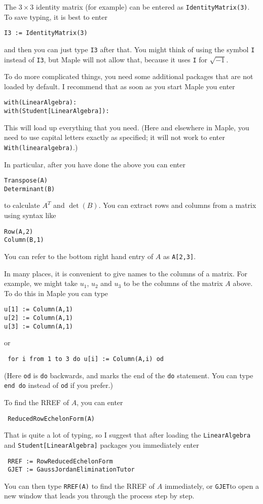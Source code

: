 \documentclass{amsart}
\begin{document}
The $3\times 3$ identity matrix (for example) can be entered as
\verb|IdentityMatrix(3)|.  To save typing, it is best to enter 
\begin{verbatim}
I3 := IdentityMatrix(3)
\end{verbatim}
and then you can just type \verb|I3| after that.  You might think of
using the symbol \verb|I| instead of \verb|I3|, but Maple will not
allow that, because it uses \verb|I| for $\sqrt{-1}$.

To do more complicated things, you need some additional packages that
are not loaded by default.  I recommend that as soon as you start
Maple you enter 
\begin{verbatim}
with(LinearAlgebra): 
with(Student[LinearAlgebra]):
\end{verbatim}
This will load up everything that you need.  (Here and elsewhere in
Maple, you need to use capital letters exactly as specified; it will
not work to enter \verb+With(linearalgebra)+.)

In particular, after you have done the above you can enter
\begin{verbatim}
Transpose(A)
Determinant(B)
\end{verbatim}
to calculate $A^T$ and $\det(B)$.  You can extract rows and columns
from a matrix using syntax like
\begin{verbatim}
Row(A,2)
Column(B,1)
\end{verbatim}
You can refer to the bottom right hand entry of $A$ as \verb+A[2,3]+.

In many places, it is convenient to give names to the columns of a
matrix.  For example, we might take $u_1$, $u_2$ and $u_3$ to be the
columns of the matrix $A$ above.  To do this in Maple you can type
\begin{verbatim}
u[1] := Column(A,1)
u[2] := Column(A,1)
u[3] := Column(A,1)
\end{verbatim}
or
\begin{verbatim}
 for i from 1 to 3 do u[i] := Column(A,i) od
\end{verbatim}
(Here \verb+od+ is \verb+do+ backwards, and marks the end of the
\verb+do+ statement.  You can type \verb+end do+ instead of \verb+od+
if you prefer.)

To find the RREF of $A$, you can enter 
\begin{verbatim}
 ReducedRowEchelonForm(A)
\end{verbatim}
That is quite a lot of typing, so I suggest that after loading the
\verb+LinearAlgebra+ and \verb+Student[LinearAlgebra]+ packages you
immediately enter
\begin{verbatim}
 RREF := RowReducedEchelonForm
 GJET := GaussJordanEliminationTutor
\end{verbatim}
You can then type \verb+RREF(A)+ to find the RREF of $A$ immediately,
or \verb+GJET+to open a new window that leads you through the process
step by step.
\end{document}
